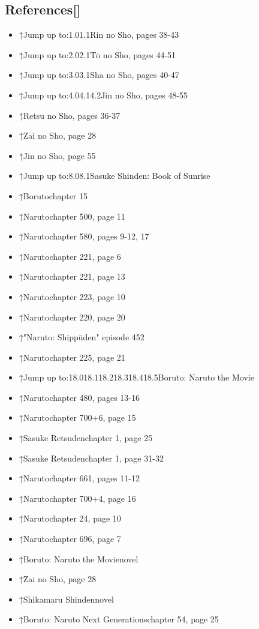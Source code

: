 \documentclass[a4paper,12pt]{article}
\begin{document}
\subsection*{References[]}\n\n\begin{itemize}
\item ↑Jump up to:1.01.1Rin no Sho, pages 38-43
\item ↑Jump up to:2.02.1Tō no Sho, pages 44-51
\item ↑Jump up to:3.03.1Sha no Sho, pages 40-47
\item ↑Jump up to:4.04.14.2Jin no Sho, pages 48-55
\item ↑Retsu no Sho, pages 36-37
\item ↑Zai no Sho, page 28
\item ↑Jin no Sho, page 55
\item ↑Jump up to:8.08.1Sasuke Shinden: Book of Sunrise
\item ↑Borutochapter 15
\item ↑Narutochapter 500, page 11
\item ↑Narutochapter 580, pages 9-12, 17
\item ↑Narutochapter 221, page 6
\item ↑Narutochapter 221, page 13
\item ↑Narutochapter 223, page 10
\item ↑Narutochapter 220, page 20
\item ↑"Naruto: Shippūden" episode 452
\item ↑Narutochapter 225, page 21
\item ↑Jump up to:18.018.118.218.318.418.5Boruto: Naruto the Movie
\item ↑Narutochapter 480, pages 13-16
\item ↑Narutochapter 700+6, page 15
\item ↑Sasuke Retsudenchapter 1, page 25
\item ↑Sasuke Retsudenchapter 1, page 31-32
\item ↑Narutochapter 661, pages 11-12
\item ↑Narutochapter 700+4, page 16
\item ↑Narutochapter 24, page 10
\item ↑Narutochapter 696, page 7
\item ↑Boruto: Naruto the Movienovel
\item ↑Zai no Sho, page 28
\item ↑Shikamaru Shindennovel
\item ↑Boruto: Naruto Next Generationschapter 54, page 25

\end{itemize}
\end{document}
